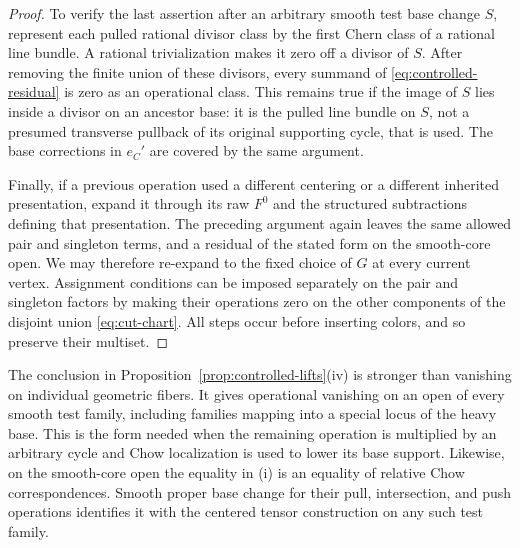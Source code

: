 \begin{proof}
To verify the last assertion after an arbitrary smooth test base
change $S$, represent each pulled rational divisor class by the
first Chern class of a rational line bundle.  A rational
trivialization makes it zero off a divisor of $S$.  After removing
the finite union of these divisors, every summand of
\eqref{eq:controlled-residual} is zero as an operational class.
This remains true if the image of $S$ lies inside a divisor on an
ancestor base: it is the pulled line bundle on $S$, not a presumed
transverse pullback of its original supporting cycle, that is used.
The base corrections in $e_C'$ are covered by the same argument.

Finally, if a previous operation used a different centering or a
different inherited presentation, expand it through its raw $F^0$
and the structured subtractions defining that presentation.  The
preceding argument again leaves the same allowed pair and singleton
terms, and a residual of the stated form on the smooth-core open.
We may therefore re-expand to
the fixed choice of $G$ at every current vertex.  Assignment
conditions can be imposed separately on the pair and singleton
factors by making their operations zero on the other components of
the disjoint union \eqref{eq:cut-chart}.  All steps occur before
inserting colors, and so preserve their multiset.
\end{proof}

\begin{remark}\label{rem:family-not-fiber}
The conclusion in Proposition~\ref{prop:controlled-lifts}\textup{(iv)}
is stronger than vanishing on individual geometric fibers.  It gives
operational vanishing on an open of every smooth test family,
including families mapping into a special locus of the heavy base.
This is the form needed when the remaining operation is multiplied
by an arbitrary cycle and Chow localization is used to lower its
base support.  Likewise, on the smooth-core open the equality in
\textup{(i)} is an equality of relative Chow correspondences.
Smooth proper base change for their pull, intersection, and push
operations identifies it with the centered tensor construction on
any such test family.
\end{remark}

